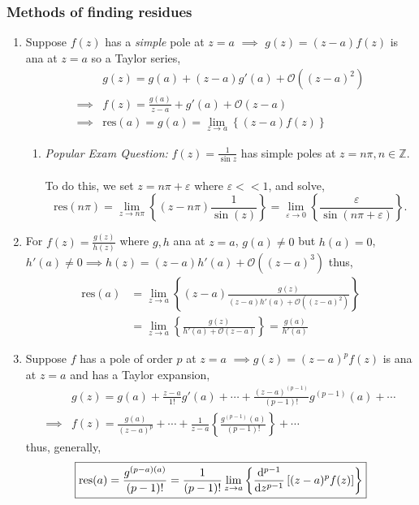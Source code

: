 \documentclass{book}
\begin{document}
\subsubsection{Methods of finding residues}
\begin{enumerate}
	\item Suppose $f(z)$ has a \textit{simple} pole at $z = a$ $\implies$ $g(z) = (z-a)f(z)$ is ana at $z=a$ so a Taylor series,
	\begin{align}
		& g(z) =  g(a) + (z-a)g'(a) + \mathcal{O}\left((z-a)^2\right) \\
		\implies & f(z) = \frac{g(a)}{z-a} + g'(a) + \mathcal{O}(z-a) \\
		\implies & \text{res}(a) = g(a) = \lim_{z \to a}\left\{(z-a)f(z)\right\}
	\end{align}
	\begin{enumerate}
		\item \textit{Popular Exam Question:} $f(z) = \frac{1}{\sin z}$ has simple poles at $z = n\pi, n \in \mathbb{Z}$.
		\\\\
		To do this, we set $z = n\pi + \varepsilon$ where $\varepsilon << 1$, and solve,
		\begin{equation}
			\text{res}(n\pi) = \lim_{z \to n\pi}\left\{(z-n\pi)\frac{1}{\sin(z)}\right\} = \lim_{\varepsilon\to0}\left\{\frac{\varepsilon}{\sin(n\pi + \varepsilon)}\right\}.
		\end{equation}
	\end{enumerate}
	\item For $f(z) = \frac{g(z)}{h(z)}$ where $g,h$ ana at $z=a$, $g(a) \neq 0$ but $h(a) = 0$, $h'(a) \neq 0 \implies h(z) = (z-a)h'(a) + \mathcal{O}\left((z-a)^3\right)$ thus,
	\begin{equation}
		\begin{split}
			\text{res}(a) & = \lim_{z \to a}\left\{(z-a)\frac{g(z)}{(z-a)h'(a) + \mathcal{O}\left((z-a)^2\right)}\right\} \\
			& = \lim_{z \to a}\left\{\frac{g(z)}{h'(a) + \mathcal{O}(z-a)}\right\} = \frac{g(a)}{h'(a)}
		\end{split}
	\end{equation}
	\item Suppose $f$ has a pole of order $p$ at $z = a$ $\implies g(z) = (z-a)^pf(z)$ is ana at $z=a$ and has a Taylor expansion,
	\begin{align}
		& g(z) = g(a) + \frac{z-a}{1!}g'(a) + \cdots + \frac{(z-a)^{(p-1)}}{(p-1)!}g^{(p-1)}(a) + \cdots \\
		\implies & f(z) = \frac{g(a)}{(z-a)^p} + \cdots + \frac{1}{z-a}\left\{\frac{g^{(p-1)}(a)}{(p-1)!}\right\} + \cdots
	\end{align}
	thus, generally,
	\begin{equation}
		\boxed{\text{res}(a) = \frac{g^{(p-a)(a)}}{(p-1)!} = \frac{1}{(p-1)!}\lim_{z\to a}\left\{\dv[p-1]{z}\left[(z-a)^pf(z)\right]\right\}}
	\end{equation}
\end{enumerate}
\end{document}
